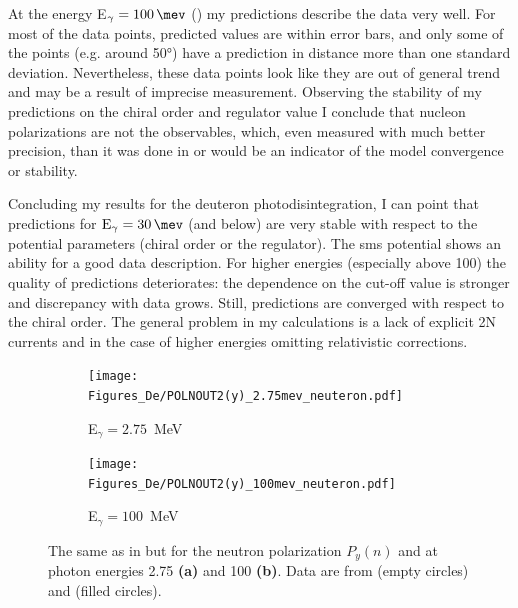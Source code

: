     At the energy E$_\gamma = \SI{100}{\mev}$ () 
    my predictions describe the data very well.
    For most of the data points, predicted values are within error bars, and only some
    of the points (e.g. around \ang{50}) have a prediction in distance more than one standard deviation.
    Nevertheless, these data points look like they are out of general trend and may be
    a result of imprecise measurement.
    Observing the stability of my predictions on the chiral order and regulator value I 
    conclude that nucleon polarizations are not the observables, which, even measured with much
    better precision, than it was done in \cite{Jewell_neuteronpolarization} or \cite{CAMERON_neuteronpolarization}
    would be an indicator of the model convergence or stability.

    Concluding my results for the deuteron photodisintegration, 
    I can point that predictions for $\text{E}_\gamma = \SI{30}{\mev}$ (and below)
    are very stable with respect to the potential parameters (chiral order or the regulator).
    The \gls{sms} potential shows an ability for a good data description.
    For higher energies (especially above \SI{100}{\mev})
    the quality of predictions deteriorates: the dependence on the cut-off value is stronger and 
    discrepancy with data grows. Still, predictions are converged with respect to the chiral order.
    The general problem in my calculations is a lack of explicit 2N currents
    and in the case of higher energies omitting relativistic corrections. 


    \begin{figure}[h]
        \centering
        \begin{subfigure}[b]{0.46\textwidth}
            \caption{\small E$_\gamma = 2.75$~MeV}
            \texttt{[image: Figures\_De/POLNOUT2(y)\_2.75mev\_neuteron.pdf]}
            \label{Pn_2p75_vert}
        \end{subfigure}
        \begin{subfigure}[b]{0.46\textwidth}
            \caption{\small E$_\gamma = 100$~MeV}
            \texttt{[image: Figures\_De/POLNOUT2(y)\_100mev\_neuteron.pdf]}
            \label{Pn_100_vert}
        \end{subfigure}
        \caption{The same as in  but for the neutron polarization
        $P_y(n)$ and at photon energies \SI{2.75}{\mev} {\bf (a)} and \SI{100}{\mev} {\bf (b)}.
        Data are from \cite{Jewell_neuteronpolarization} (empty circles)
        and \cite{CAMERON_neuteronpolarization} (filled circles).}
        \label{Pn_2p75_100}
    \end{figure}


